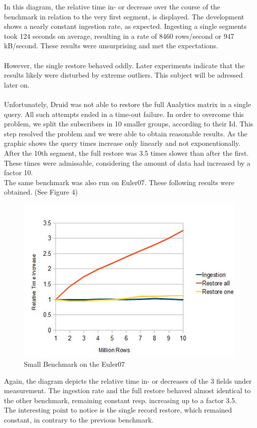 \documentclass[11pt,singlecolumn]{scrartcl}
\begin{document}
In this diagram, the relative time in- or decrease over the course of the benchmark  in relation to the very first segment, is displayed. The development shows a nearly constant ingestion rate, as expected. Ingesting a single segments took 124 seconds on average, resulting in a rate of 8460 rows/second or 947 kB/second. These results were unsurprising and met the expectations.\\
\\
However, the single restore behaved oddly. Later experiments indicate that the results likely were disturbed by extreme outliers. This subject will be adressed later on.\\\\
Unfortunately, Druid was not able to restore the full Analytics matrix in a single query. All such attempts ended in a time-out failure. In order to overcome this problem, we split the subscribers in 10 smaller groups, according to their Id. This step resolved the problem and we were able to obtain reasonable results.
As the graphic shows the query times increase only linearly and not exponentionally. After the 10th segment, the full restore was 3.5 times slower than after the first. These times were admissable, considering the amount of data had increased by a factor 10. 
\\[1cm]
The same benchmark was also run on Euler07. These following results were obtained. (See Figure 4)  

\begin{figure}[h]
\includegraphics{meul.jpg}
\caption{Small Benchmark on the Euler07}
\end{figure}


Again, the diagram depicts the relative time in- or decreases of the 3 fields under measurement. The ingestion rate and the full restore behaved almost identical to the other benchmark, remaining constant resp. increasing up to a factor 3.5.\\
The interesting point to notice is the single record restore, which remained constant, in contrary to the previous benchmark. 
\end{document}

